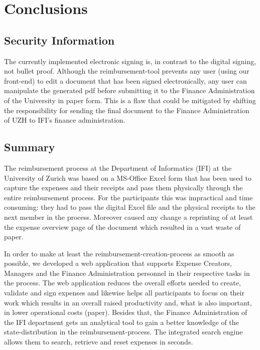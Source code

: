\chapter{Conclusions}
 
\section{Security Information}
The currently implemented electronic signing is, in contrast to the digital signing, not bullet proof. Although the reimbursement-tool prevents any user (using our front-end) to edit a document that has been signed electronically, any user can manipulate the generated pdf before submitting it to the Finance Administration of the University in paper form. This is a flaw that could be mitigated by shifting the responsibility for sending the final document to the Finance Administration of UZH to IFI's finance administration.
 
 
\section{Summary}
The reimbursement process at the Department of Informatics (IFI) at the University of Zurich was based on a MS-Office Excel form that has been used to capture the expenses and their receipts and pass them physically through the entire reimbursement process. For the participants this was impractical and time consuming: they had to pass the digital Excel file and the physical receipts to the next member in the process. Moreover caused any change a reprinting of at least the expense overview page of the document which resulted in a vast waste of paper.\par

In order to make at least the reimbursement-creation-process as smooth as possible, we developed a web application that supports Expense Creators, Managers and the Finance Administration personnel in their respective tasks in the process. The web application reduces the overall efforts needed to create, validate and sign expenses and likewise helps all participants to focus on their work which results in an overall raised productivity and, what is also important, in lower operational costs (paper). Besides that, the Finance Administration of the IFI department gets an analytical tool to gain a better knowledge of the state-distribution in the reimbursement-process. The integrated search engine allows them to search, retrieve and reset expenses in seconds. \par


